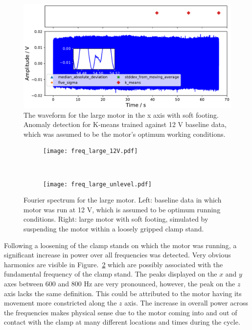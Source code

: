 \begin{figure}[t]
    \includegraphics[width=1.0\textwidth]{fig/large_unlevel_large_12V.pdf}
    \caption[Anomaly Tests Large Motor Uneven Footing]{The waveform for the large motor in the x axis with soft footing. Anomaly detection for K-means trained against 12 V baseline data, which was assumed to be the motor's optimum working conditions.}
    \label{fig:large_uneven_footing}
\end{figure}



\begin{figure}[t!]
    \centering
    \begin{subfigure}[t]{0.5\textwidth}
        \centering
        \texttt{[image: freq\_large\_12V.pdf]}
    \end{subfigure}%
    ~ 
    \begin{subfigure}[t]{0.5\textwidth}
        \centering
        \texttt{[image: freq\_large\_unlevel.pdf]}
    \end{subfigure}
    \caption[Fourier Plot Soft Footing]{Fourier spectrum for the large motor. Left: baseline data in which motor was run at 12 V, which is assumed to be optimum running conditions. Right: large motor with soft footing, simulated by suspending the motor within a loosely gripped clamp stand. }
    \label{soft_footing}
\end{figure}

Following a loosening of the clamp stands on which the motor was running, a significant increase in power over all frequencies was detected. Very obvious harmonics are visible in Figure.~\ref{soft_footing} which are possibly associated with the fundamental frequency of the clamp stand. The peaks displayed on the $x$ and $y$ axes between 600 and 800 Hz are very pronounced, however, the peak on the $z$ axis lacks the same definition. This could be attributed to the motor having its movement more constricted along the $z$ axis. The increase in overall power across the frequencies makes physical sense due to the motor coming into and out of contact with the clamp at many different locations and times during the cycle.

